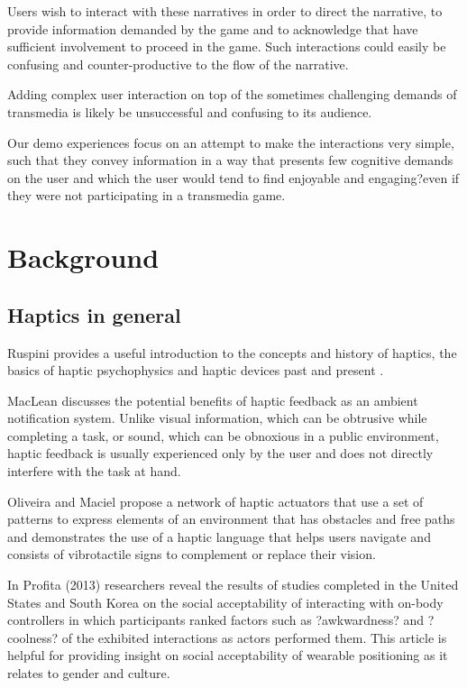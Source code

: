 \documentclass{chi-ext}
\begin{document}
Users wish to interact with these narratives in order to direct the narrative, to provide information demanded by the game and to acknowledge that have sufficient involvement to proceed in the game. Such interactions could easily be confusing and counter-productive to the flow of the narrative. 

Adding complex user interaction on top of the sometimes challenging demands of transmedia is likely be unsuccessful and confusing to its audience. 

Our demo experiences focus on an attempt to make the interactions very simple, such that they convey information in a way that presents few cognitive demands on the user and which the user would tend to find enjoyable and engaging?even if they were not participating in a transmedia game. 

\section{Background}

\subsection{Haptics in general}
Ruspini provides a useful introduction to the concepts and history of haptics, the basics of haptic psychophysics and haptic devices past and present \cite{ruspini1999haptics}.

MacLean \cite{maclean2009putting} discusses the potential benefits of haptic feedback as an ambient notification system. Unlike visual information, which can be obtrusive while completing a task, or sound, which can be obnoxious in a public environment, haptic feedback is usually experienced only by the user and does not directly interfere with the task at hand. 

Oliveira and Maciel propose a network of haptic actuators that use a set of patterns to express elements of an environment that has obstacles and free paths and demonstrates the use of a haptic language that helps users navigate and consists of vibrotactile signs to complement or replace their vision. \cite{deusing}

In Profita (2013) \cite{profita2013don} researchers reveal the results of studies completed in the United States and South Korea on the social acceptability of interacting with on-body controllers in which participants  ranked factors such as ?awkwardness? and ?coolness? of the exhibited interactions as actors performed them. This article is helpful for providing insight on social acceptability of wearable positioning as it relates to gender and culture.
\end{document}
